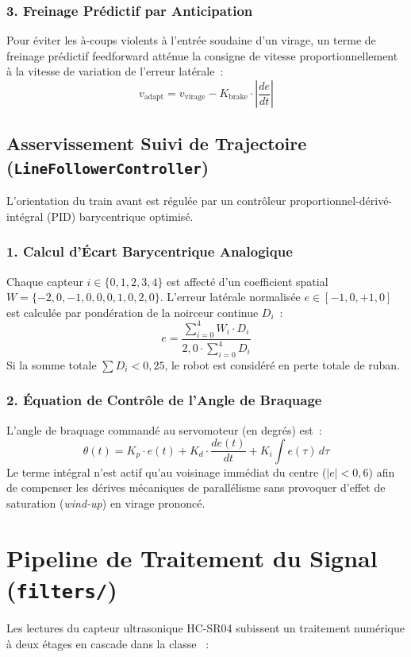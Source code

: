 \subsubsection{3. Freinage Prédictif par Anticipation}
Pour éviter les à-coups violents à l'entrée soudaine d'un virage, un terme de freinage prédictif feedforward atténue la consigne de vitesse proportionnellement à la vitesse de variation de l'erreur latérale~:
\begin{equation}
    v_{\text{adapt}} = v_{\text{virage}} - K_{\text{brake}} \cdot \left|\frac{de}{dt}\right|
\end{equation}

\subsection{Asservissement Suivi de Trajectoire (\texttt{LineFollowerController})}
L'orientation du train avant est régulée par un contrôleur proportionnel-dérivé-intégral (PID) barycentrique optimisé.

\subsubsection{1. Calcul d'Écart Barycentrique Analogique}
Chaque capteur $i \in \{0, 1, 2, 3, 4\}$ est affecté d'un coefficient spatial $W = \{-2{,}0, -1{,}0, 0{,}0, 1{,}0, 2{,}0\}$. L'erreur latérale normalisée $e \in [-1{,}0, +1{,}0]$ est calculée par pondération de la noirceur continue $D_i$~:
\begin{equation}
    e = \frac{\sum_{i=0}^{4} W_i \cdot D_i}{2{,}0 \cdot \sum_{i=0}^{4} D_i}
\end{equation}
Si la somme totale $\sum D_i < 0{,}25$, le robot est considéré en perte totale de ruban.

\subsubsection{2. Équation de Contrôle de l'Angle de Braquage}
L'angle de braquage commandé au servomoteur (en degrés) est~:
\begin{equation}
    \theta(t) = K_p \cdot e(t) + K_d \cdot \frac{de(t)}{dt} + K_i \int e(\tau) \, d\tau
\end{equation}
Le terme intégral n'est actif qu'au voisinage immédiat du centre ($|e| < 0{,}6$) afin de compenser les dérives mécaniques de parallélisme sans provoquer d'effet de saturation (\emph{wind-up}) en virage prononcé.

\section{Pipeline de Traitement du Signal (\texttt{filters/})}
Les lectures du capteur ultrasonique HC-SR04 subissent un traitement numérique à deux étages en cascade dans la classe ~:

